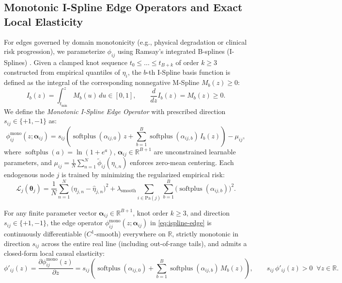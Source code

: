 \subsection{Monotonic I-Spline Edge Operators and Exact Local Elasticity}
For edges governed by domain monotonicity (e.g., physical degradation or clinical risk progression), we parameterize $\phi_{ij}$ using Ramsay's integrated B-splines (I-Splines) \citep{ramsay1988monotone}. Given a clamped knot sequence $t_0 \le \dots \le t_{B+k}$ of order $k \ge 3$ constructed from empirical quantiles of $\eta_i$, the $b$-th I-Spline basis function is defined as the integral of the corresponding nonnegative M-Spline $M_b(z) \ge 0$:
\begin{equation}
  I_b(z) = \int_{t_{\min}}^{z} M_b(u)\,du \in [0, 1], \qquad \frac{d}{dz} I_b(z) = M_b(z) \ge 0.
\end{equation}
We define the \emph{Monotonic I-Spline Edge Operator} with prescribed direction $s_{ij} \in \{+1, -1\}$ as:
\begin{equation}
  \phi_{ij}^{\mathrm{mono}}(z; \boldsymbol{\alpha}_{ij})
  = s_{ij}\!\left(\operatorname{softplus}(\alpha_{ij,0})\,z + \sum_{b=1}^{B} \operatorname{softplus}(\alpha_{ij,b})\,I_b(z)\right) - \mu_{ij},
  \label{eq:ispline-edge}
\end{equation}
where $\operatorname{softplus}(a) = \ln(1 + e^a)$, $\boldsymbol{\alpha}_{ij} \in \mathbb{R}^{B+1}$ are unconstrained learnable parameters, and $\mu_{ij} = \frac{1}{N}\sum_{n=1}^N \tilde{\phi}_{ij}(\eta_{i,n})$ enforces zero-mean centering. Each endogenous node $j$ is trained by minimizing the regularized empirical risk:
\begin{equation}
  \mathcal{L}_j(\boldsymbol{\theta}_j) = \frac{1}{N}\sum_{n=1}^{N}\big(\eta_{j,n} - \hat{\eta}_{j,n}\big)^2
  + \lambda_{\mathrm{smooth}} \sum_{i \in \mathrm{Pa}(j)} \sum_{b=1}^{B} \big(\operatorname{softplus}(\alpha_{ij,b})\big)^2.
  \label{eq:node-loss}
\end{equation}

\begin{proposition}
\label{prop:monotonicity}
For any finite parameter vector $\boldsymbol{\alpha}_{ij} \in \mathbb{R}^{B+1}$, knot order $k \ge 3$, and direction $s_{ij} \in \{+1, -1\}$, the edge operator $\phi_{ij}^{\mathrm{mono}}(z; \boldsymbol{\alpha}_{ij})$ in \eqref{eq:ispline-edge} is continuously differentiable ($C^1$-smooth) everywhere on $\mathbb{R}$, strictly monotonic in direction $s_{ij}$ across the entire real line (including out-of-range tails), and admits a closed-form local causal elasticity:
\begin{equation}
  \phi'_{ij}(z) = \frac{\partial \phi_{ij}^{\mathrm{mono}}(z)}{\partial z}
  = s_{ij}\!\left(\operatorname{softplus}(\alpha_{ij,0}) + \sum_{b=1}^{B}\operatorname{softplus}(\alpha_{ij,b})\,M_b(z)\right),
  \qquad s_{ij}\,\phi'_{ij}(z) > 0 \;\; \forall z \in \mathbb{R}.
\end{equation}
\end{proposition}

